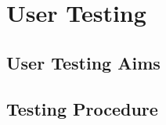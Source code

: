 \documentclass[../../main.tex]{subfiles}
\begin{document}
\section{User Testing}

	\subsection{User Testing Aims}

	\subsection{Testing Procedure}

		\subsubsection{}
\end{document}
